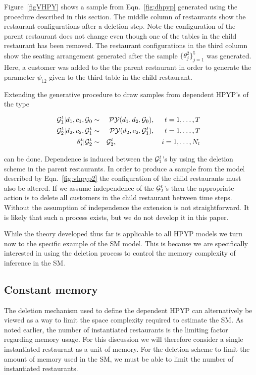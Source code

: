 Figure~\ref{figVHPY} shows a sample from Eqn.~\ref{fig:dhpyp} generated using the procedure described in this section. The middle column of restaurants show the restaurant configurations after a deletion step.  Note the configuration of the parent restaurant does not change even though one of the tables in the child restaurant has been removed.  The restaurant configurations in the third column show the seating arrangement  generated after the sample $\{ \theta_j^2 \}_{j = 1}^5$ was generated.  Here, a customer was added to the the parent restaurant in order to generate the parameter $\psi_{12}$  given to the third table in the child restaurant.

Extending the generative procedure to draw samples from dependent HPYP's of the type

\begin{eqnarray}
\G_1^t | d_1, c_1, \G_0  &\sim& \PY(d_1,d_2,\G_0), \hspace{.5cm} t = 1,\dots, T  \label{fig:vhpyp2}\\
\G_2^t | d_2, c_2, \G_1^t &\sim& \PY(d_2, c_2, \G_1^t),  \hspace{.5cm} t = 1,\dots, T \nonumber \\
\theta^t_i | \G_2^t &\sim& \G_2^t, \hspace{2.28cm} i = 1, \dots, N_t \nonumber
\end{eqnarray}

can be done. Dependence is induced between the $\G_1^t$'s by using the deletion scheme in the parent restaurants.  In order to produce a sample from the model described by Eqn.~\ref{fig:vhpyp2} the configuration of the child restaurants must also be altered.  If we assume independence of the $\G_2^t$'s then the appropriate action is to delete all customers in the child restaurant between time steps. Without the assumption of independence the extension is not straightforward. It is likely that such a process exists, but we do not develop it in this paper.

While the theory developed thus far is applicable to all HPYP models we turn now to the specific example of the SM model.  This is because we are specifically interested in using the deletion process to control the memory complexity of inference in the SM.

\subsection{Constant memory}
The deletion mechanism used to define the dependent HPYP can alternatively be viewed as a way to limit the space complexity required to estimate the SM. As noted earlier, the number of instantiated restaurants is the limiting factor regarding memory usage.  For this discussion we will therefore consider a single instantiated restaurant as a unit of memory. For the deletion scheme to limit the amount of memory used in the SM, we must be able to limit the number of instantiated restaurants.


